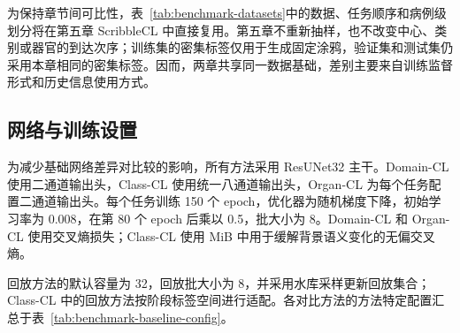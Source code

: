 为保持章节间可比性，表~\ref{tab:benchmark-datasets}中的数据、任务顺序和病例级划分将在第五章 ScribbleCL 中直接复用。第五章不重新抽样，也不改变中心、类别或器官的到达次序；训练集的密集标签仅用于生成固定涂鸦，验证集和测试集仍采用本章相同的密集标签。因而，两章共享同一数据基础，差别主要来自训练监督形式和历史信息使用方式。

\subsection*{网络与训练设置}

为减少基础网络差异对比较的影响，所有方法采用 ResUNet32 主干。Domain-CL 使用二通道输出头，Class-CL 使用统一八通道输出头，Organ-CL 为每个任务配置二通道输出头。每个任务训练 150 个 epoch，优化器为随机梯度下降，初始学习率为 0.008，在第 80 个 epoch 后乘以 0.5，批大小为 8。Domain-CL 和 Organ-CL 使用交叉熵损失；Class-CL 使用 MiB 中用于缓解背景语义变化的无偏交叉熵。

回放方法的默认容量为 32，回放批大小为 8，并采用水库采样更新回放集合；Class-CL 中的回放方法按阶段标签空间进行适配。各对比方法的方法特定配置汇总于表~\ref{tab:benchmark-baseline-config}。


